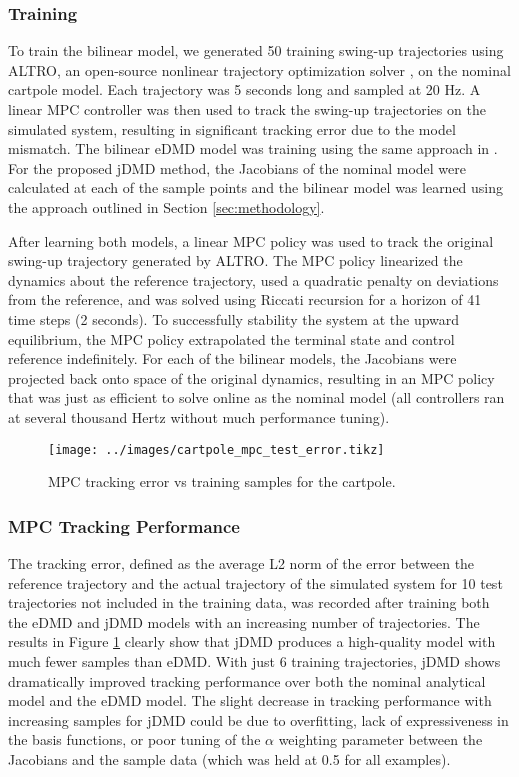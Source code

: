 \documentclass{article}
\begin{document}
\subsubsection{Training}
To train the bilinear model, we generated 50 training swing-up trajectories using ALTRO, an
open-source nonlinear trajectory optimization solver , on the 
nominal cartpole model. Each trajectory was 5 seconds long and sampled at 20 Hz.  A linear
MPC controller was then used to track the swing-up trajectories on the simulated system,
resulting in significant tracking error due to the model mismatch. The bilinear eDMD model
was training using the same approach in \cite{Folkestad2021}. For the proposed jDMD method,
the Jacobians of the nominal model were calculated at each of the sample points and the 
bilinear model was learned using the approach outlined in Section \ref{sec:methodology}.

After learning both models, a linear MPC policy was used to track the original swing-up
trajectory generated by ALTRO. The MPC policy linearized the dynamics about the reference 
trajectory, used a quadratic penalty on deviations from the reference, and was solved using 
Riccati recursion for a horizon of 41 time steps (2 seconds). To successfully stability the 
system at the upward equilibrium, the MPC policy extrapolated the terminal state and control
reference indefinitely. For each of the bilinear models, the Jacobians were projected back 
onto space of the original dynamics, resulting in an MPC policy that was just as efficient
to solve online as the nominal model (all controllers ran at several thousand Hertz without
much performance tuning). 

\begin{figure}[t]
  \centering
  \texttt{[image: ../images/cartpole\_mpc\_test\_error.tikz]}
  \label{fig:cartpole_mpc_test_error}
  \caption{MPC tracking error vs training samples for the cartpole.}
\end{figure}

\subsubsection{MPC Tracking Performance}
The tracking error, defined as the average L2 norm of the error between the reference 
trajectory and the actual trajectory of the simulated system for 10 test trajectories not 
included in the training data, was recorded after training both the eDMD and jDMD models
with an increasing number of trajectories. The results in Figure
\ref{fig:cartpole_mpc_test_error} clearly show that jDMD produces a high-quality model with
much fewer samples than eDMD. With just 6 training trajectories, jDMD shows dramatically
improved tracking performance over both the nominal analytical model and the eDMD model. The
slight decrease in tracking performance with increasing samples for jDMD could be due to 
overfitting, lack of expressiveness in the basis functions, or poor tuning of the $\alpha$ 
weighting parameter between the Jacobians and the sample data (which was held at 0.5 for all
examples).
\end{document}
